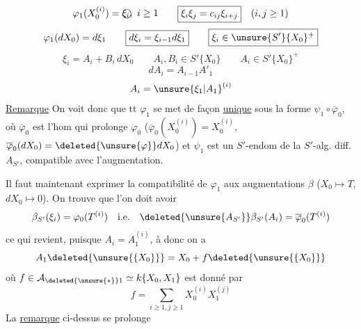 \[
\varphi_1(X_0^{(i)})=\text{\textcircled{$\xi_i,\ i\geq1$}}\qquad\boxed{\xi_i\xi_j=c_{ij}\xi_{i+j}}\quad(i,j\geq1)
\]
\[
\varphi_1(dX_0)=d\xi_1\qquad\boxed{d\xi_i=\xi_{i-1}d\xi_1}\qquad\boxed{\xi_i\in\unsure{S'}\{X_0\}^+}
\]
\[
\xi_i=A_i+B_i\,dX_0\qquad A_i,B_i\in S'\{X_0\}\qquad A_i\in S'\{X_0\}^+
\]
\[
dA_i=A_{i-1}A'_1
\]
\[
A_i=\unsure{\xi_1|A_1}^{(i)}
\]
\uline{Remarque} On voit donc que tt $\varphi_1$ se met de façon \uline{unique} sous la forme $\psi_1\circ\overline\varphi_0$, où $\overline\varphi_0$ est l'hom qui prolonge $\varphi_0$ ($\overline\varphi_0(X_0^{(i)})=X_0^{(i)}$, $\overline\varphi_0(dX_0)=\deleted{\unsure{\varphi}}dX_0$) et $\psi_1$ est un $S'$-endom de la $S'$-alg. diff. $A_{S'}$, compatible avec l'augmentation.

Il faut maintenant exprimer la compatibilité de $\varphi_1$ aux augmentations $\beta$  ($X_0\longmapsto T$,  $dX_0\longmapsto0$).
On trouve que l'on doit avoir
\[
\beta_{S'}(\xi_i)=\varphi_0(T^{(i)})\quad\text{i.e.}\quad\deleted{\unsure{A_{S'}}}\beta_{S'}(A_i)=\overline\varphi_0(T^{(i)})
\]
ce qui revient, puisque $A_i=A_1^{(i)}$, à
\inserted{\[
\left\{\begin{array}{l}
\beta_{S'}(A_1)=\overline\varphi_0(T)\\
\varphi_0(T^{(i)})=\varphi_0(T)^{(i)}
\end{array}\right.
\]}
donc on a
\[
A_1\deleted{\unsure{\{X_0\}}}=X_0+f\deleted{\unsure{\{X_0\}}}
\]
où $f\in\mathcal A_{\deleted{\unsure{*}}1}\simeq k\{X_0,X_1\}$ est donné par
\[
f=\sum_{i\geq1,j\geq1}X_0^{(i)}X_1^{(j)}
\]
La \uline{remarque} ci-dessus se prolonge 
